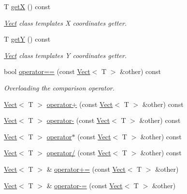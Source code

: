 \begin{DoxyCompactItemize}
T \hyperlink{class_arcade_1_1_vect_a07237933a773c4f626a89415846886f1}{getX} () const
\begin{DoxyCompactList}\small\item\em \hyperlink{class_arcade_1_1_vect}{Vect} class template\textquotesingle{}s X coordinate\textquotesingle{}s getter. \end{DoxyCompactList}\item 
T \hyperlink{class_arcade_1_1_vect_a7d8b8821d45ff6faa5164f8cbccb0875}{getY} () const
\begin{DoxyCompactList}\small\item\em \hyperlink{class_arcade_1_1_vect}{Vect} class template\textquotesingle{}s Y coordinate\textquotesingle{}s getter. \end{DoxyCompactList}\item 
bool \hyperlink{class_arcade_1_1_vect_a553d8d71f49bd9623a1bfa6c01c28174}{operator==} (const \hyperlink{class_arcade_1_1_vect}{Vect}$<$ T $>$ \&other) const
\begin{DoxyCompactList}\small\item\em Overloading the comparison operator. \end{DoxyCompactList}\item 
\hyperlink{class_arcade_1_1_vect}{Vect}$<$ T $>$ \hyperlink{class_arcade_1_1_vect_a63deac98e5926a6a11901d4accb2c838}{operator+} (const \hyperlink{class_arcade_1_1_vect}{Vect}$<$ T $>$ \&other) const
\item 
\hyperlink{class_arcade_1_1_vect}{Vect}$<$ T $>$ \hyperlink{class_arcade_1_1_vect_a8dcc249d6a66e36cc75df3c809f2fd4f}{operator-\/} (const \hyperlink{class_arcade_1_1_vect}{Vect}$<$ T $>$ \&other) const
\item 
\hyperlink{class_arcade_1_1_vect}{Vect}$<$ T $>$ \hyperlink{class_arcade_1_1_vect_a81ec17a7c29e37edb411397070b71db2}{operator$\ast$} (const \hyperlink{class_arcade_1_1_vect}{Vect}$<$ T $>$ \&other) const
\item 
\hyperlink{class_arcade_1_1_vect}{Vect}$<$ T $>$ \hyperlink{class_arcade_1_1_vect_ae34d76a3387c62538f9c20c8acb42fa6}{operator/} (const \hyperlink{class_arcade_1_1_vect}{Vect}$<$ T $>$ \&other) const
\item 
\hyperlink{class_arcade_1_1_vect}{Vect}$<$ T $>$ \& \hyperlink{class_arcade_1_1_vect_a6ac5816789a378675e9d568327649e21}{operator+=} (const \hyperlink{class_arcade_1_1_vect}{Vect}$<$ T $>$ \&other)
\item 
\hyperlink{class_arcade_1_1_vect}{Vect}$<$ T $>$ \& \hyperlink{class_arcade_1_1_vect_a5e0919a6e98f86643268fd2270436d60}{operator-\/=} (const \hyperlink{class_arcade_1_1_vect}{Vect}$<$ T $>$ \&other)

\end{DoxyCompactItemize}
